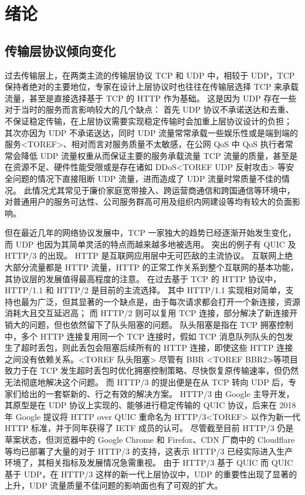 

\chapter{绪论}

\section{传输层协议倾向变化}

过去传输层上，在两类主流的传输层协议 TCP 和 UDP 中，相较于 UDP，TCP 保持者绝对的主要地位，专家在设计上层协议时也往往在传输层选择 TCP 来承载流量，甚至是直接选择基于 TCP 的 HTTP 作为基础。
这是因为 UDP 存在一些对于当时的服务而言影响较大的几个缺点：
首先 UDP 协议不承诺送达和去重\cite{rfc768}、不保证稳定传输，在上层协议需要实现稳定传输时会加重上层协议设计的负担；
其次亦因为 UDP 不承诺送达，同时 UDP 流量常常承载一些娱乐性或是端到端的服务<TOREF>、相对而言对服务质量不太敏感，在公网 QoS 中 QoS 执行者常常会降低 UDP 流量权重从而保证主要的服务承载流量 TCP 流量的质量，甚至是在资源不足、硬件性能受限或是存在诸如 DDoS<TOREF UDP 反射攻击> 等安全问题的情况下直接阻断 UDP 流量，进而造成了 UDP 流量时常质量不佳的情况。
此情况尤其常见于廉价家庭宽带接入、跨运营商通信和跨国通信等环境中，对普通用户的服务可达性、公司服务群高可用及组织内网建设等均有较大的负面影响。

但在最近几年的网络协议发展中，TCP 一家独大的趋势已经逐渐开始发生变化，而 UDP 也因为其简单灵活的特点而越来越多地被选用。
突出的例子有 QUIC 及 HTTP/3 的出现。
HTTP 是互联网应用层中无可匹敌的主流协议。
互联网上绝大部分流量都是 HTTP 流量，HTTP 的正常工作关系到整个互联网的基本功能，其协议层的发展值得最高程度的注意。
在过去基于 TCP 的 HTTP 协议中，HTTP/1.1 和 HTTP/2 是目前的主流选择。
其中 HTTP/1.1 实现相对简单，支持也最为广泛，但其显著的一个缺点是，由于每次请求都会打开一个新连接，资源消耗大且交互延迟高；
而 HTTP/2 则可以复用 TCP 连接，部分解决了新连接开销大的问题，但也依然留下了队头阻塞的问题。
队头阻塞是指在 TCP 拥塞控制中，多个 HTTP 连接复用同一个 TCP 连接时，假如 TCP 消息队列队头的包发生了超时丢包，则此丢包会阻塞后续所有的 HTTP 连接，即使这些 HTTP 连接之间没有依赖关系。<TOREF 队头阻塞>
尽管有 BBR\cite{45646} <TOREF BBR2>等项目致力于在 TCP 发生超时丢包时优化拥塞控制策略、尽快恢复原传输速率，但仍然无法彻底地解决这个问题。
而 HTTP/3 的提出便是在从 TCP 转向 UDP 后，专家们给出的一套崭新的、行之有效的解决方案。
HTTP/3 由 Google 主导开发，其原型是在 UDP 协议上实现的、能够进行稳定传输的 QUIC 协议，后来在 2018 年 Google 提议将 HTTP over QUIC 重命名为 HTTP/3<TOREF> 以作为新一代 HTTP 标准，并于同年获得了 IETF 成员的认可。
尽管截至目前 HTTP/3 仍是草案状态\cite{ietf-quic-http-34}，但浏览器中的 Google Chrome 和 Firefox、CDN 厂商中的 Cloudflare 等均已部署了大量的对于 HTTP/3 的支持，这表示 HTTP/3 已经实际进入生产环境了，其相关指标及发展情况急需重视。
由于 HTTP/3 基于 QUIC 而 QUIC 基于 UDP，在 HTTP/3 这样的新一代上层协议中，UDP 的重要性出现了显著的上升，UDP 流量质量不佳问题的影响面也有了可观的扩大。

